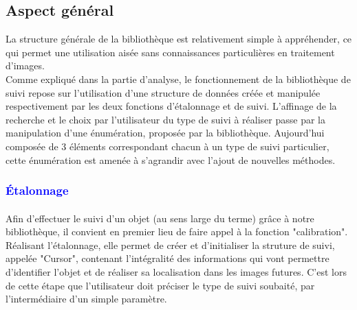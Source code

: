 \documentclass{report}
\begin{document}
				\subsection{Aspect général}
				La structure générale de la bibliothèque est relativement simple à appréhender, ce qui permet une utilisation aisée sans connaissances particulières en traitement d'images.\\
				Comme expliqué dans la partie d'analyse, le fonctionnement de la bibliothèque de suivi repose sur l'utilisation d'une structure de données créée et manipulée respectivement par les deux fonctions d'étalonnage et de suivi. L'affinage de la recherche et le choix par l'utilisateur du type de suivi à réaliser passe par la manipulation d'une énumération, proposée par la bibliothèque. Aujourd'hui composée de 3 éléments correspondant chacun à un type de suivi particulier, cette énumération est amenée à s'agrandir avec l'ajout de nouvelles méthodes.
				\subsubsection{\textcolor{blue}{Étalonnage}} \paragraph{}
				Afin d'effectuer le suivi d'un objet (au sens large du terme) grâce à notre bibliothèque, il convient en premier lieu de faire appel à la fonction "calibration". Réalisant l'étalonnage, elle permet de créer et d'initialiser la struture de suivi, appelée "Cursor", contenant l'intégralité des informations qui vont permettre d'identifier l'objet et de réaliser sa localisation dans les images futures. C'est lors de cette étape que l'utilisateur doit préciser le type de suivi soubaité, par l'intermédiaire d'un simple paramètre.
\end{document}
